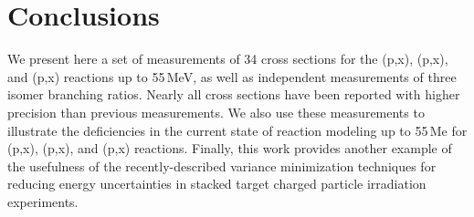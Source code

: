 % 
% 





 
 \section{\label{sec:conclusions_fe}Conclusions}
 

We present here a set of measurements of 34 cross sections for the (p,x), (p,x), and  (p,x) reactions up to 55\,MeV, as well as  independent measurements of three isomer branching ratios.
Nearly all cross sections have been reported with higher precision than previous measurements.
We also use these measurements to illustrate the deficiencies in the current state of  reaction modeling up to 55\,Me for  (p,x), (p,x), and  (p,x) reactions.
Finally, this work provides another example of the usefulness of the recently-described variance minimization techniques for reducing energy uncertainties in stacked target charged particle irradiation experiments.


